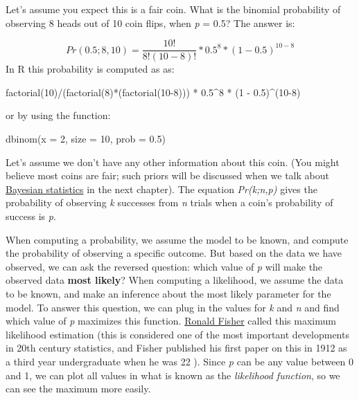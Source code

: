 \documentclass[
  oneside]{krantz}
\makeatletter
\newenvironment{Shaded}{\begin{snugshade}}{\end{snugshade}}
\newcommand{\AttributeTok}[1]{\textcolor[rgb]{0.61,0.61,0.61}{#1}}
\newcommand{\DecValTok}[1]{\textcolor[rgb]{0.06,0.06,0.06}{#1}}
\newcommand{\FloatTok}[1]{\textcolor[rgb]{0.06,0.06,0.06}{#1}}
\newcommand{\FunctionTok}[1]{\textcolor[rgb]{0,0,0}{#1}}
\newcommand{\NormalTok}[1]{#1}
\newcommand{\SpecialCharTok}[1]{\textcolor[rgb]{0,0,0}{#1}}
\newenvironment{kframe}{%
\medskip{}
\setlength{\fboxsep}{.8em}
 \def\at@end@of@kframe{}%
 \ifinner\ifhmode%
  \def\at@end@of@kframe{\end{minipage}}%
  \begin{minipage}{\columnwidth}%
 \fi\fi%
 \def\FrameCommand##1{\hskip\@totalleftmargin \hskip-\fboxsep
 \colorbox{shadecolor}{##1}\hskip-\fboxsep
     \hskip-\linewidth \hskip-\@totalleftmargin \hskip\columnwidth}%
 \MakeFramed {\advance\hsize-\width
   \@totalleftmargin\z@ \linewidth\hsize
   \@setminipage}}%
 {\par\unskip\endMakeFramed%
 \at@end@of@kframe}
\renewenvironment{Shaded}{\begin{kframe}}{\end{kframe}}
\makeatother
\begin{document}
Let's assume you expect this is a fair coin. What is the binomial probability of observing 8 heads out of 10 coin flips, when \emph{p} = 0.5? The answer is:

\[
Pr\left(0.5;8,10 \right) = \frac{10!}{8!\left( 10 - 8 \right)!}*0.5^{8}*{(1 - 0.5)}^{10 - 8}
\]
In R this probability is computed as as:

\begin{Shaded}
\begin{Highlighting}[]
\FunctionTok{factorial}\NormalTok{(}\DecValTok{10}\NormalTok{)}\SpecialCharTok{/}\NormalTok{(}\FunctionTok{factorial}\NormalTok{(}\DecValTok{8}\NormalTok{)}\SpecialCharTok{*}\NormalTok{(}\FunctionTok{factorial}\NormalTok{(}\DecValTok{10{-}8}\NormalTok{))) }\SpecialCharTok{*} \FloatTok{0.5}\SpecialCharTok{\^{}}\DecValTok{8} \SpecialCharTok{*}\NormalTok{ (}\DecValTok{1} \SpecialCharTok{{-}} \FloatTok{0.5}\NormalTok{)}\SpecialCharTok{\^{}}\NormalTok{(}\DecValTok{10{-}8}\NormalTok{)}
\end{Highlighting}
\end{Shaded}

or by using the function:

\begin{Shaded}
\begin{Highlighting}[]
\FunctionTok{dbinom}\NormalTok{(}\AttributeTok{x =} \DecValTok{2}\NormalTok{, }\AttributeTok{size =} \DecValTok{10}\NormalTok{, }\AttributeTok{prob =} \FloatTok{0.5}\NormalTok{)}
\end{Highlighting}
\end{Shaded}

Let's assume we don't have any other information about this coin. (You might believe most coins are fair; such priors will be discussed when we talk about \protect\hyperlink{bayes}{Bayesian statistics} in the next chapter). The equation \emph{Pr(k;n,p)} gives the probability of observing \emph{k} successes from \emph{n} trials when a coin's probability of success is \emph{p}.

When computing a probability, we assume the model to be known, and compute the probability of observing a specific outcome. But based on the data we have observed, we can ask the reversed question: which value of \emph{p} will make the observed data \textbf{most likely}? When computing a likelihood, we assume the data to be known, and make an inference about the most likely parameter for the model. To answer this question, we can plug in the values for \emph{k} and \emph{n} and find which value of \emph{p} maximizes this function. \href{https://en.wikipedia.org/wiki/Ronald_Fisher}{Ronald Fisher} called this maximum likelihood estimation (this is considered one of the most important developments in 20th century statistics, and Fisher published his first paper on this in 1912 as a third year undergraduate when he was 22 \citep{aldrich_r_1997}). Since \emph{p} can be any value between 0 and 1, we can plot all values in what is known as the \emph{likelihood function}, so we can see the maximum more easily.
\end{document}
